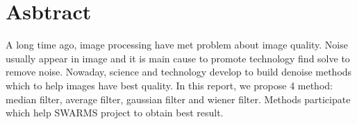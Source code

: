 \chapter*{Asbtract}
\vspace{0.5cm}

A long time ago, image processing have met problem about image quality. Noise usually appear in image and it is main cause to promote technology find solve to remove noise. Nowaday, science and technology develop to build denoise methods which to help images have best quality. In this report, we propose 4 method: median filter, average filter, gaussian filter and wiener filter. Methods participate which help SWARMS project to obtain best result.


